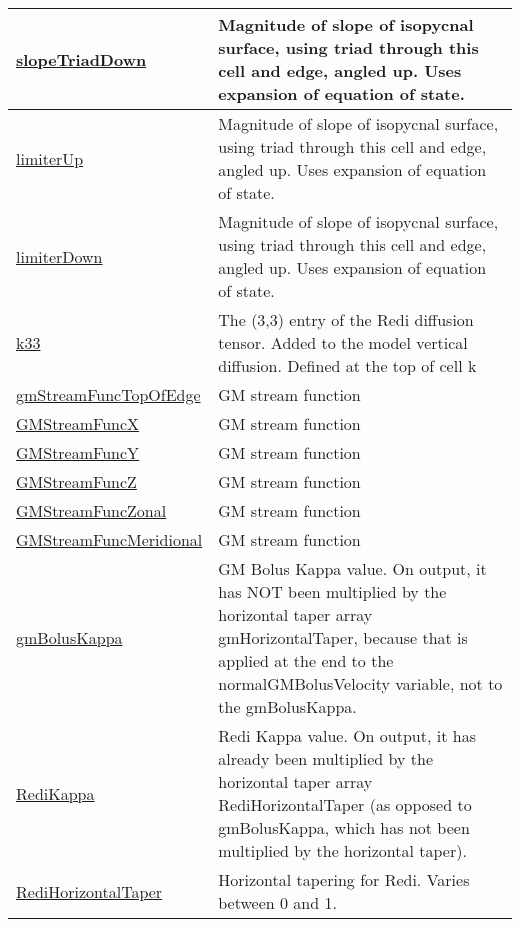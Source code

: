 {\begin{center}
\begin{longtable}{| p{2.0in} | p{4.0in} |}
    \hline
    \hyperref[subsec:var_sec_diagnostics_slopeTriadDown]{slopeTriadDown} & Magnitude of slope of isopycnal surface, using triad through this cell and edge, angled up. Uses expansion of equation of state. \\
    \hline
    \hyperref[subsec:var_sec_diagnostics_limiterUp]{limiterUp} & Magnitude of slope of isopycnal surface, using triad through this cell and edge, angled up. Uses expansion of equation of state. \\
    \hline
    \hyperref[subsec:var_sec_diagnostics_limiterDown]{limiterDown} & Magnitude of slope of isopycnal surface, using triad through this cell and edge, angled up. Uses expansion of equation of state. \\
    \hline
    \hyperref[subsec:var_sec_diagnostics_k33]{k33} & The (3,3) entry of the Redi diffusion tensor. Added to the model vertical diffusion. Defined at the top of cell k \\
    \hline
    \hyperref[subsec:var_sec_diagnostics_gmStreamFuncTopOfEdge]{gmStreamFuncTopOfEdge} & GM stream function \\
    \hline
    \hyperref[subsec:var_sec_diagnostics_GMStreamFuncX]{GMStreamFuncX} & GM stream function \\
    \hline
    \hyperref[subsec:var_sec_diagnostics_GMStreamFuncY]{GMStreamFuncY} & GM stream function \\
    \hline
    \hyperref[subsec:var_sec_diagnostics_GMStreamFuncZ]{GMStreamFuncZ} & GM stream function \\
    \hline
    \hyperref[subsec:var_sec_diagnostics_GMStreamFuncZonal]{GMStreamFuncZonal} & GM stream function \\
    \hline
    \hyperref[subsec:var_sec_diagnostics_GMStreamFuncMeridional]{GMStreamFuncMeridional} & GM stream function \\
    \hline
    \hyperref[subsec:var_sec_diagnostics_gmBolusKappa]{gmBolusKappa} & GM Bolus Kappa value.  On output, it has NOT been multiplied by the horizontal taper array gmHorizontalTaper, because that is applied at the end to the normalGMBolusVelocity variable, not to the gmBolusKappa. \\
    \hline
    \hyperref[subsec:var_sec_diagnostics_RediKappa]{RediKappa} & Redi Kappa value.  On output, it has already been multiplied by the horizontal taper array RediHorizontalTaper (as opposed to gmBolusKappa, which has not been multiplied by the horizontal taper). \\
    \hline
    \hyperref[subsec:var_sec_diagnostics_RediHorizontalTaper]{RediHorizontalTaper} & Horizontal tapering for Redi. Varies between 0 and 1. \\

\end{longtable}
\end{center}}
